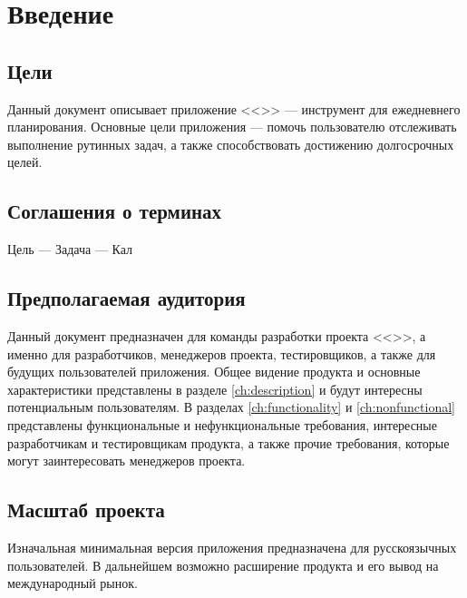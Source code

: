 \chapter{Введение}
\section{Цели}
Данный документ описывает приложение <<\vProjectName>> --- инструмент для ежедневнего планирования. Основные цели приложения --- помочь пользователю отслеживать выполнение рутинных задач, а также способствовать достижению долгосрочных целей.

\section{Соглашения о терминах}
Цель ---
Задача ---
Кал

\section{Предполагаемая аудитория}
Данный документ предназначен для команды разработки проекта <<\vProjectName>>, а именно для разработчиков, менеджеров проекта, тестировщиков, а также для будущих пользователей приложения. Общее видение продукта и основные характеристики представлены в разделе \ref{ch:description} и будут интересны потенциальным пользователям. В разделах \ref{ch:functionality} и \ref{ch:nonfunctional} представлены функциональные и нефункциональные требования, интересные разработчикам и тестировщикам продукта, а также прочие требования, которые могут заинтересовать менеджеров проекта. 

\section{Масштаб проекта}
Изначальная минимальная версия приложения предназначена для русскоязычных пользователей. В дальнейшем возможно расширение продукта и его вывод на международный рынок.

